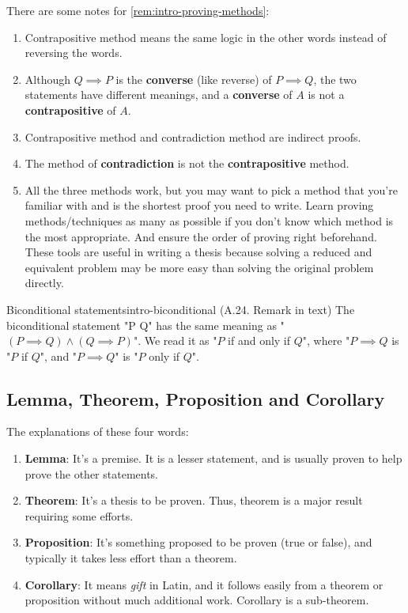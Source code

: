\documentclass[../src/handouts/main.tex]{subfiles}
\begin{document}
There are some notes for \cref{rem:intro-proving-methods}:
\begin{enumerate}
  \item Contrapositive method means the same logic in the other words instead of reversing the words.
  \item Although $Q \implies P$ is the \textbf{converse} (like reverse) of $P \implies Q$, the two statements have different meanings, and a \textbf{converse} of $A$ is not a \textbf{contrapositive} of $A$.
  \item Contrapositive method and contradiction method are indirect proofs.
  \item The method of \textbf{contradiction} is not the \textbf{contrapositive} method.
  \item All the three methods work, but you may want to pick a method that you're familiar with and is the shortest proof you need to write. Learn proving methods/techniques as many as possible if you don't know which method is the most appropriate. And ensure the order of proving right beforehand. These tools are useful in writing a thesis because solving a reduced and equivalent problem may be more easy than solving the original problem directly.
\end{enumerate}

\begin{remark}{Biconditional statements}{intro-biconditional}
  (A.24. Remark in text)
  The biconditional statement "P \iff Q" has the same meaning as "$(P \implies Q) \land (Q \implies P)$". We read it as "$P$ if and only if $Q$", where "$P \implies Q$ is "$P$ if $Q$", and "$P \implies Q$" is "$P$ only if $Q$".
\end{remark}

\subsection{Lemma, Theorem, Proposition and Corollary}

The explanations of these four words:
\begin{enumerate}
  \item \textbf{Lemma}: It's a premise. It is a lesser statement, and is usually proven to help prove the other statements.
  \item \textbf{Theorem}: It's a thesis to be proven. Thus, theorem is a major result requiring some efforts.
  \item \textbf{Proposition}: It's something proposed to be proven (true or false), and typically it takes less effort than a theorem.
  \item \textbf{Corollary}: It means \textit{gift} in Latin, and it follows easily from a theorem or proposition without much additional work. Corollary is a sub-theorem.
\end{enumerate}
\end{document}
